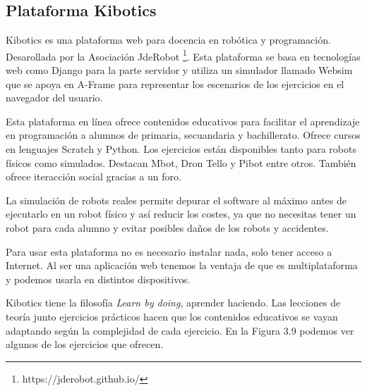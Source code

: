 \subsection{Plataforma Kibotics}

Kibotics es una plataforma web para docencia en robótica y programación. Desarollada por la Asociación JdeRobot \footnote{https://jderobot.github.io/}. 
Esta plataforma se basa en tecnologías web como Django para la parte servidor y utiliza un simulador llamado Websim que se apoya en A-Frame para representar los escenarios de los ejercicios en el navegador del usuario.

Esta plataforma en línea ofrece contenidos educativos para facilitar el aprendizaje en programación a alumnos de primaria, secuandaria y bachillerato. Ofrece cursos en lenguajes Scratch y Python. Los ejercicios están disponibles tanto para robots físicos como simulados. Destacan Mbot, Dron Tello y Pibot entre otros.
También ofrece iteracción social gracias a un foro.

La simulación de robots reales permite  depurar el software al máximo antes de ejecutarlo en un robot físico y así reducir los costes, ya que no necesitas tener un robot para cada alumno y evitar  posibles daños de los robots y accidentes.

Para usar esta plataforma no es necesario instalar nada, solo tener acceso a Internet. Al ser una aplicación web tenemos la ventaja de que es multiplataforma y podemos usarla en distintos dispositivos.

Kibotics tiene la filosofía \textit{Learn by doing}, aprender haciendo. Las lecciones de teoría junto ejercicios prácticos hacen que los contenidos educativos se vayan adaptando según la complejidad de cada ejercicio. En la Figura 3.9 podemos ver algunos de los ejercicios que ofrecen.

